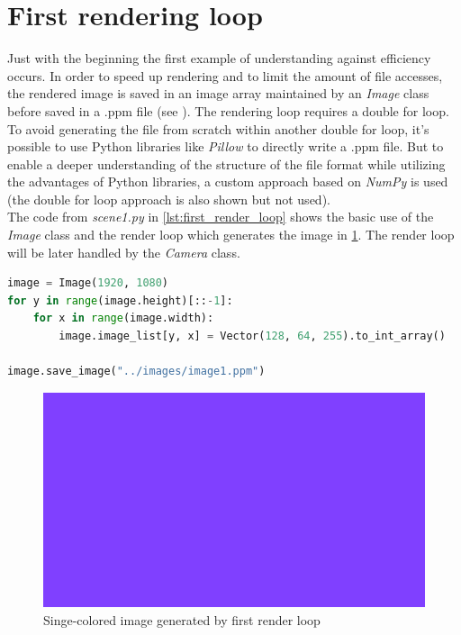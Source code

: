 \documentclass[]{article}
\begin{document}
	\section{First rendering loop}
	Just with the beginning the first example of understanding against efficiency occurs. In order to speed up rendering and to limit the amount of file accesses, the rendered image is saved in an image array maintained by an \emph{Image} class before saved in a .ppm file (see \cite{PPM}). The rendering loop requires a double for loop. To avoid generating the file from scratch within another double for loop, it’s possible to use Python libraries like \emph{Pillow} to directly write a .ppm file. But to enable a deeper understanding of the structure of the file format while utilizing the advantages of Python libraries, a custom approach based on \emph{NumPy} is used (the double for loop approach is also shown but not used).
	\\
	The code from \emph{scene1.py} in \cref{lst:first_render_loop} shows the basic use of the \emph{Image} class and the render loop which generates the image in \cref{fig:image1}. The render loop will be later handled by the \emph{Camera} class.
	
	\begin{lstlisting}[caption={Example for a basic render loop}, language=Python, label=lst:first_render_loop]
image = Image(1920, 1080)
for y in range(image.height)[::-1]:
	for x in range(image.width):
		image.image_list[y, x] = Vector(128, 64, 255).to_int_array()

image.save_image("../images/image1.ppm")
	\end{lstlisting}

	\begin{figure}[h]
		\centering
		\includegraphics[width=0.9\linewidth]{image1}
		\caption{Singe-colored image generated by first render loop}
		\label{fig:image1}
	\end{figure}
\end{document}
